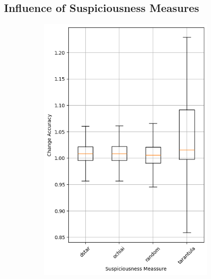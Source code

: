 \subsection{Influence of Suspiciousness Measures}\label{subsec:influence-of-suspiciousness-measures}
\begin{figure}
    \begin{subfigure}{0.5\textwidth}
        \centering
        \includegraphics[width=0.95\textwidth]{plots/Meassure_Trained_accuracy.png}
    \end{subfigure}
    \begin{subfigure}{0.5\textwidth}
        \centering

\end{subfigure}
\end{figure}
